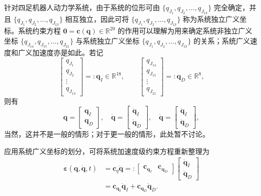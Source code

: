 针对四足机器人动力学系统，由于系统的位形可由 $\{ q_{J_1}, q_{J_2}, \ldots, q_{J_{13}} \}$ 完全确定，并且 $\{ q_{J_1}, q_{J_2}, \ldots, q_{J_{13}} \}$ 相互独立，因此可将 $\{ q_{J_1}, q_{J_2}, \ldots, q_{J_{13}} \}$ 称为系统独立广义坐标。系统约束方程 $\boldsymbol{0} = \boldsymbol{c}(\boldsymbol{q}) \in \mathbb{R}^{20}$ 的作用可以理解为用来确定系统非独立广义坐标 $\{ q_{J_{14}}, q_{J_{15}}, \ldots, q_{J_{21}} \}$ 与系统独立广义坐标 $\{ q_{J_1}, q_{J_2}, \ldots, q_{J_{13}} \}$ 的关系；系统广义速度和广义加速度亦是如此。若记
\begin{equation}\label{eq:11.30}
\begin{bmatrix}
q_{J_1} \\ q_{J_2} \\ \vdots \\ q_{J_{13}}
\end{bmatrix}
=: \boldsymbol{q}_I \in \mathbb{R}^{18},
\qquad
\begin{bmatrix}
q_{J_{14}} \\ q_{J_{15}} \\ \vdots \\ q_{J_{21}}
\end{bmatrix}
=: \boldsymbol{q}_D \in \mathbb{R}^{8},
\end{equation}
则有
\begin{equation}\label{eq:11.31}
\boldsymbol{q} = \begin{bmatrix}
\boldsymbol{q}_I \\[4pt]
\boldsymbol{q}_D
\end{bmatrix},
\quad
\dot{\boldsymbol{q}} = \begin{bmatrix}
\dot{\boldsymbol{q}}_I \\[4pt]
\dot{\boldsymbol{q}}_D
\end{bmatrix},
\quad
\ddot{\boldsymbol{q}} = \begin{bmatrix}
\ddot{\boldsymbol{q}}_I \\[4pt]
\ddot{\boldsymbol{q}}_D
\end{bmatrix},
\end{equation}
当然，这并不是一般的情形；对于更一般的情形，此处暂不讨论。

应用系统广义坐标的划分，可将系统加速度级约束方程重新整理为
\begin{equation}\label{eq:11.32}
\begin{aligned}
\boldsymbol{\varepsilon}(\boldsymbol{q}, \dot{\boldsymbol{q}}, t) &= \boldsymbol{c}_{q} \ddot{\boldsymbol{q}}
=: \begin{bmatrix}
\boldsymbol{c}_{\boldsymbol{q}_I} & \boldsymbol{c}_{\boldsymbol{q}_D}
\end{bmatrix}
\begin{bmatrix}
\ddot{\boldsymbol{q}}_I \\[4pt]
\ddot{\boldsymbol{q}}_D
\end{bmatrix} \\
&= \boldsymbol{c}_{\boldsymbol{q}_I} \ddot{\boldsymbol{q}}_I + \boldsymbol{c}_{\boldsymbol{q}_D} \ddot{\boldsymbol{q}}_D.
\end{aligned}
\end{equation}

